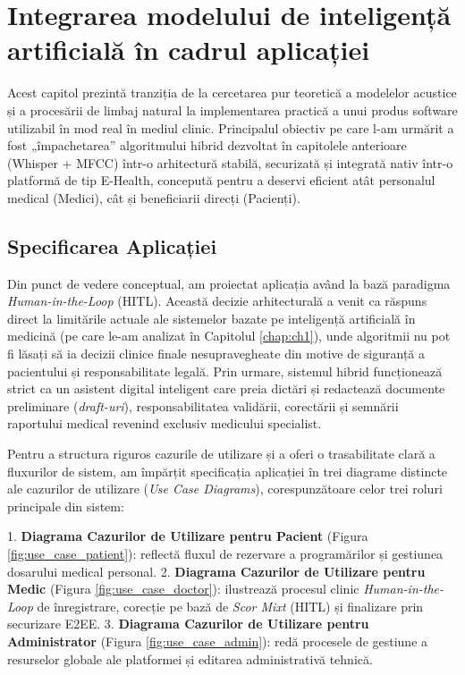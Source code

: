 \chapter{Integrarea modelului de inteligență artificială în cadrul aplicației}
\label{chap:ch4}

Acest capitol prezintă tranziția de la cercetarea pur teoretică a modelelor acustice și a procesării de limbaj natural la implementarea practică a unui produs software utilizabil în mod real în mediul clinic. Principalul obiectiv pe care l-am urmărit a fost „împachetarea” algoritmului hibrid dezvoltat în capitolele anterioare (Whisper + MFCC) într-o arhitectură stabilă, securizată și integrată nativ într-o platformă de tip E-Health, concepută pentru a deservi eficient atât personalul medical (Medici), cât și beneficiarii direcți (Pacienți).

\section{Specificarea Aplicației}
\label{sec:ch4sec1}

Din punct de vedere conceptual, am proiectat aplicația având la bază paradigma \textit{Human-in-the-Loop} (HITL). Această decizie arhitecturală a venit ca răspuns direct la limitările actuale ale sistemelor bazate pe inteligență artificială în medicină (pe care le-am analizat în Capitolul \ref{chap:ch1}), unde algoritmii nu pot fi lăsați să ia decizii clinice finale nesupravegheate din motive de siguranță a pacientului și responsabilitate legală. Prin urmare, sistemul hibrid funcționează strict ca un asistent digital inteligent care preia dictări și redactează documente preliminare (\textit{draft-uri}), responsabilitatea validării, corectării și semnării raportului medical revenind exclusiv medicului specialist. 

Pentru a structura riguros cazurile de utilizare și a oferi o trasabilitate clară a fluxurilor de sistem, am împărțit specificația aplicației în trei diagrame distincte ale cazurilor de utilizare (\textit{Use Case Diagrams}), corespunzătoare celor trei roluri principale din sistem:

1. \textbf{Diagrama Cazurilor de Utilizare pentru Pacient} (Figura \ref{fig:use_case_patient}): reflectă fluxul de rezervare a programărilor și gestiunea dosarului medical personal.
2. \textbf{Diagrama Cazurilor de Utilizare pentru Medic} (Figura \ref{fig:use_case_doctor}): ilustrează procesul clinic \textit{Human-in-the-Loop} de înregistrare, corecție pe bază de \textit{Scor Mixt} (HITL) și finalizare prin securizare E2EE.
3. \textbf{Diagrama Cazurilor de Utilizare pentru Administrator} (Figura \ref{fig:use_case_admin}): redă procesele de gestiune a resurselor globale ale platformei și editarea administrativă tehnică.

